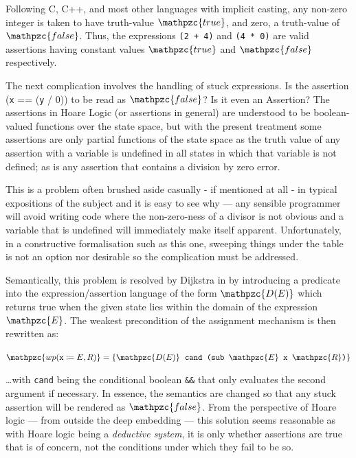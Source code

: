 \documentclass[oneside,12pt]{article}
\newcommand{\impcode}[1]{\textsc{\texttt{#1}}}
\newcommand{\textM}[1]{\ensuremath{\mathpzc{#1}}}
\begin{document}
Following C, C++, and most other languages with implicit casting, any non-zero integer is taken to have truth-value \textM{true}, and zero, a truth-value of \textM{false}. Thus, the expressions \texttt{(2 + 4)} and \texttt{(4 * 0)} are valid assertions having constant values \textM{true} and \textM{false} respectively.


The next complication involves the handling of stuck expressions. Is the assertion (\texttt{x} == (\texttt{y} / 0)) to be read as \textM{false}? Is it even an Assertion? The assertions in Hoare Logic (or assertions in general) are understood to be boolean-valued functions over the state space, but with the present treatment some assertions are only partial functions of the state space as the truth value of any assertion with a variable is undefined in all states in which that variable is not defined; as is any assertion that contains a division by zero error.


This is a problem often brushed aside casually - if mentioned at all - in typical expositions of the subject and it is easy to see why --- any sensible programmer will avoid writing code where the non-zero-ness of a divisor is not obvious and a variable that is undefined will immediately make itself apparent. Unfortunately, in a constructive formalisation such as this one, sweeping things under the table is not an option nor desirable so the complication must be addressed.


Semantically, this problem is resolved by Dijkstra in \cite{Dijkstra76} by introducing a predicate into the expression/assertion language of the form $\textM{D(E)}$ which returns true when the given state lies within the domain of the expression \textM{E}. The weakest precondition of the assignment mechanism is then rewritten as:


\begin{center}
  $ \textM{wp( \texttt{x} \coloneqq E , R )} = \{ \textM{D(E)} \texttt{\;\;cand (sub \textM{E} x \textM{R})} \}$ 
\end{center}


\ldots with \texttt{cand} being the conditional boolean \impcode{\&\&} that only evaluates the second argument if necessary. In essence, the semantics are changed so that any stuck assertion will be rendered as \textM{false}. From the perspective of Hoare logic --- from outside the deep embedding --- this solution seems reasonable as with Hoare logic being a \emph{deductive system}, it is only whether assertions are true that is of concern, not the conditions under which they fail to be so.
\end{document}
